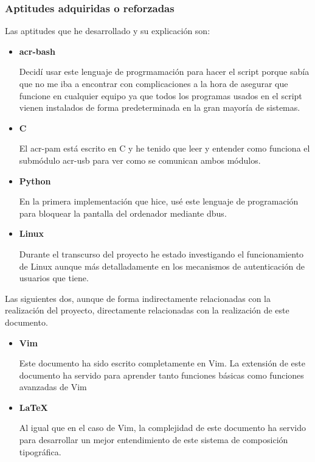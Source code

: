 \documentclass[titlepage, 12pt, a4paper]{article}
\begin{document}
\subsubsection{Aptitudes adquiridas o reforzadas}
Las aptitudes que he desarrollado y su explicación son:
\begin{itemize}
	\item{\textbf{\gls{acr-bash}}}\par Decidí usar este lenguaje de progrmamación para hacer el script porque sabía que no me iba a encontrar con complicaciones a la hora de asegurar que funcione en cualquier equipo ya que todos los programas usados en el script vienen instalados de forma predeterminada en la gran mayoría de sistemas.
	\item{\textbf{\gls{C}}}\par El \gls{acr-pam} está escrito en \gls{C} y he tenido que leer y entender como funciona el submódulo \gls{acr-usb} para ver como se comunican ambos módulos.
	\item{\textbf{\gls{Python}}}\par En la primera implementación que hice, usé este lenguaje de programación para bloquear la pantalla del ordenador mediante \gls{dbus}.
	\item{\textbf{\gls{Linux}}}\par Durante el transcurso del proyecto he estado investigando el funcionamiento de \gls{Linux} aunque más detalladamente en los mecanismos de autenticación de usuarios que tiene.
\end{itemize}
Las siguientes dos, aunque de forma indirectamente relacionadas con la realización del proyecto, directamente relacionadas con la realización de este documento.
\begin{itemize}
	\item{\textbf{\gls{Vim}}}\par Este documento ha sido escrito completamente en \gls{Vim}. La extensión de este documento ha servido para aprender tanto funciones básicas como funciones avanzadas de \gls{Vim}
	\item{\textbf{\LaTeX{}}}\par Al igual que en el caso de \gls{Vim}, la complejidad de este documento ha servido para desarrollar un mejor entendimiento de este sistema de composición tipográfica.
\end{itemize}
\end{document}
